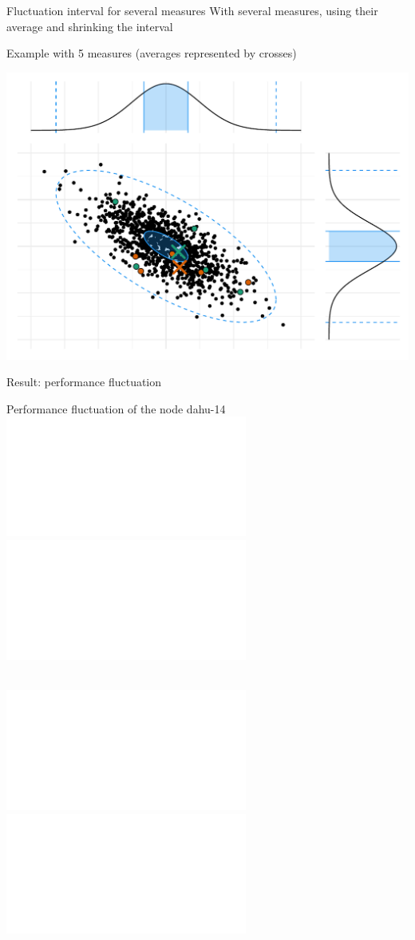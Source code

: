 \documentclass[10pt]{beamer}
\begin{document}
\begin{frame}{Fluctuation interval for several measures}
    With several measures, using their \alert{average} and shrinking the interval

    Example with 5 measures (averages represented by crosses)

    \begin{center}
        \includegraphics[width=0.8\linewidth]{img/experiment/non_regression/statistics/several_points.pdf}
    \end{center}
\end{frame}

\begin{frame}{Result: performance fluctuation}
    \begin{center}
        \begin{minipage}[t][.4\textheight][t]{\textwidth}
            Performance fluctuation of the node dahu-14 \\
            \includegraphics<1-2>[width=0.9\linewidth]{img/slides/evolution_dahu-14.pdf}
            \includegraphics<3>[width=0.9\linewidth]{img/slides/evolution_dahu-14_windowed.pdf}
        \end{minipage}
        \begin{minipage}[t][.4\textheight][t]{\textwidth}
             \\
            \includegraphics<2>[width=0.9\linewidth]{img/slides/evolution_dahu-32.pdf}
            \includegraphics<3>[width=0.9\linewidth]{img/slides/evolution_dahu-32_windowed.pdf}
        \end{minipage}
    \end{center}
\end{frame}
\end{document}
